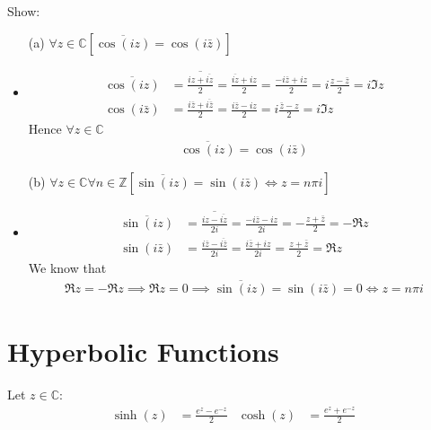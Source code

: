 \documentclass[12pt, english]{book}
\makeatletter
\renewenvironment{proof}[1][\proofname]{\par
	\pushQED{\qed}%
	\normalfont \topsep6\p@\@plus6\p@\relax
	\list{}{%
		\settowidth{\leftmargin}{\itshape\proofname:\hskip\labelsep}%
		\setlength{\labelwidth}{0pt}%
		\setlength{\itemindent}{-\leftmargin}%
	}%
	\item[\hskip\labelsep\itshape#1\@addpunct{:}]\ignorespaces
	}{ \popQED\endlist\@endpefalse}
\makeatother
\begin{document}
	\begin{example}
		Show: 
		\begin{itemize}
			\item[(a)] \(\forall z \in \mathbb{C}[\overline{\cos(iz)} = \cos(i\bar{z})]\) 
			\begin{proof}
			{\color{Grey}
				\begin{align*}
					\overline{\cos(iz)} 
					&= \overline{\frac{iz + \overline{iz}}{2}} = \frac{\overline{iz} + iz}{2} = \frac{-i\bar{z} + iz}{2} = i\frac{z - \bar{z}}{2} = i \Im{z}\\
					\cos(i\bar{z}) 
					&= \frac{i\bar{z} + \overline{i\bar{z}}}{2} = \frac{i\bar{z} - i z}{2} = i\frac{\bar{z} - z}{2} = i\Im{z}
				\end{align*}
				Hence \(\forall z \in \mathbb{C}\)
				\begin{align*}
					\overline{\cos(iz)} = \cos(i\bar{z})
				\end{align*}
			}
			\end{proof}
			
			\item[(b)] \(\forall z \in \mathbb{C} \forall n \in \mathbb{Z} [\overline{\sin(iz)} = \sin(i\bar{z}) \iff z = n \pi i]\) 
			\begin{proof}
			{\color{Grey}
				\begin{align*}
					\overline{\sin(iz)} 
					&= \overline{\frac{iz - \overline{iz}}{2i}} = \frac{-i\bar{z} - iz}{2i} = -\frac{z + \bar{z}}{2} = -\Re{z} \\
					\sin(i\bar{z})
					&= \frac{i\bar{z} - \overline{i\bar{z}}}{2i} = \frac{i \bar{z} + iz}{2i} = \frac{z + \bar{z}}{2} = \Re{z}
				\end{align*}
				We know that 
				\begin{align*}
					\Re{z} = -\Re{z} \implies \Re{z} = 0 \implies \overline{\sin(iz)} = \sin(i\bar{z}) = 0 \iff z = n\pi i
				\end{align*}
			}
			\end{proof}
		\end{itemize}
	\end{example}

	\section{Hyperbolic Functions} \label{Hyperbolic Functions Section - Complex}
	
	\begin{definition}
		 
		\label{Hyperbolic Sine and Cosine Functions Definition - Complex}
		Let \(z \in \mathbb{C}\):
		\begin{align*}
			\sinh(z) &= \frac{e^z - e^{-z}}{2} & \cosh(z) &= \frac{e^z + e^{-z}}{2}
		\end{align*}
	\end{definition}
	
\end{document}
